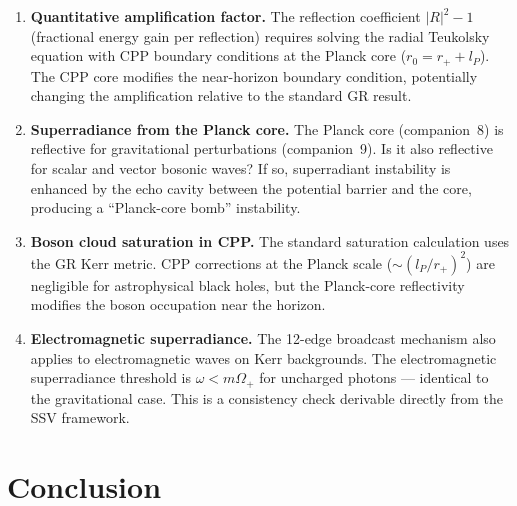 \documentclass[12pt]{article}
\newcommand{\lP}{l_P}
\newcommand{\rplus}{r_+}
\newcommand{\Oplus}{\Omega_+}
\begin{document}
\begin{enumerate}
  \item \textbf{Quantitative amplification factor.}
    The reflection coefficient $|R|^2 - 1$ (fractional energy gain per
    reflection) requires solving the radial Teukolsky equation with CPP
    boundary conditions at the Planck core ($r_0 = \rplus + \lP$).
    The CPP core modifies the near-horizon boundary condition, potentially
    changing the amplification relative to the standard GR result.

  \item \textbf{Superradiance from the Planck core.}
    The Planck core (companion~8) is reflective for gravitational
    perturbations (companion~9).  Is it also reflective for scalar
    and vector bosonic waves?  If so, superradiant instability is
    enhanced by the echo cavity between the potential barrier and
    the core, producing a ``Planck-core bomb'' instability.

  \item \textbf{Boson cloud saturation in CPP.}
    The standard saturation calculation uses the GR Kerr metric.
    CPP corrections at the Planck scale ($\sim (l_P/r_+)^2$) are
    negligible for astrophysical black holes, but the Planck-core
    reflectivity modifies the boson occupation near the horizon.

  \item \textbf{Electromagnetic superradiance.}
    The 12-edge broadcast mechanism also applies to electromagnetic
    waves on Kerr backgrounds.  The electromagnetic superradiance
    threshold is $\omega < m\Oplus$ for uncharged photons — identical
    to the gravitational case.  This is a consistency check derivable
    directly from the SSV framework.
\end{enumerate}

\section{Conclusion}
\label{sec:conclusion}
\end{document}

